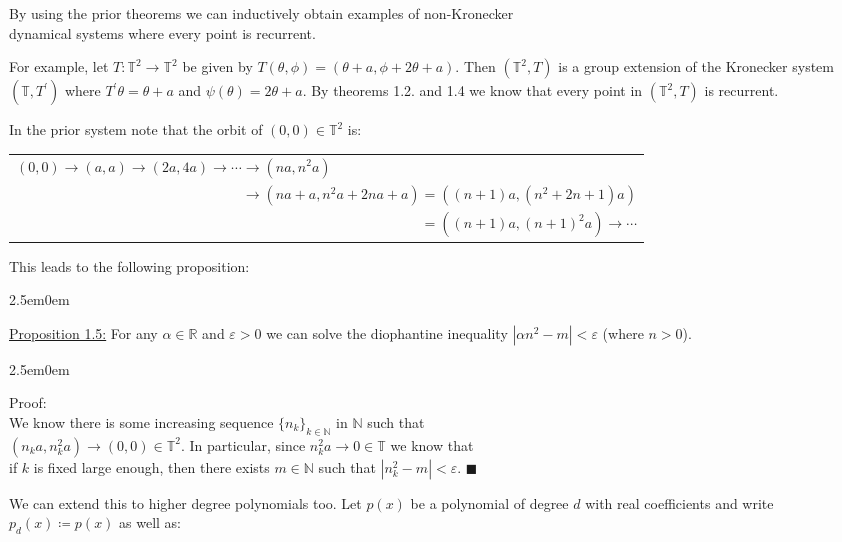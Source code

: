 \documentclass{book}
\newcommand{\hTwo}{%
\color{Black}%
   \fontsize{13}{15}\selectfont%
}
\newcommand{\exTwo}{%
   \color{Purple}%
   \fontsize{13}{15}\selectfont%
}
\newcommand{\exThreeP}{%
   \color{RedViolet}%
   \fontsize{12}{14}\selectfont%
}
\newenvironment{myIndent}{%
   \begin{adjustwidth}{2.5em}{0em}%
}{%
   \end{adjustwidth}%
}
\newcommand{\retTwo}{\hfill\bigbreak}
\begin{document}
\hTwo By using the prior theorems we can inductively obtain examples of non-Kronecker\\ dynamical systems where every point is recurrent.\retTwo

For example, let $T : \mathbb{T}^2 \to \mathbb{T}^2$ be given by $T(\theta, \phi) = (\theta + a, \phi + 2\theta + a)$. Then $(\mathbb{T}^2, T)$ is a group extension of the Kronecker system $(\mathbb{T}, T^\prime)$ where $T^\prime \theta = \theta + a$ and $\psi(\theta) = 2\theta + a$. By theorems 1.2. and 1.4 we know that every point in $(\mathbb{T}^2, T)$ is recurrent.

In the prior system note that the orbit of $(0, 0) \in \mathbb{T}^2$ is:

{\centering\begin{tabular}{l}
	$(0, 0) \to (a, a) \to (2a, 4a) \to \cdots \to (na, n^2 a)$\\ [4pt]
	$\phantom{(0, 0) \to (a, a) \to (2a, 4a) \to \cdots} \to (na + a, n^2a + 2na + a) = ((n+1)a, (n^2 +2n + 1)a)$\\ [4pt]
	$\phantom{(0, 0) \to (a, a) \to (2a, 4a) \to \cdots \to (na + a, n^2a + 2na + a)} = ((n+1)a, (n+1)^2a) \to \cdots$ 
\end{tabular}\retTwo\par}

This leads to the following proposition:

\begin{myIndent}\exTwo
	\ul{Proposition 1.5:} For any $\alpha \in \mathbb{R}$ and $\varepsilon > 0$ we can solve the diophantine inequality $|\alpha n^2 - m| < \varepsilon$ (where $n > 0$).

	\begin{myIndent}\exThreeP
		Proof:\\
		We know there is some increasing sequence $\{n_k\}_{k \in \mathbb{N}}$ in $\mathbb{N}$ such that\\ $(n_k a, n_k^2 a) \to (0, 0) \in \mathbb{T}^2$. In particular, since $n_k^2 a \to 0 \in \mathbb{T}$ we know that\\ if $k$ is fixed large enough, then there exists $m \in \mathbb{N}$ such that $|n_k^2 - m| < \varepsilon$. $\blacksquare$\retTwo
	\end{myIndent}
\end{myIndent}

We can extend this to higher degree polynomials too. Let $p(x)$ be a polynomial of degree $d$ with real coefficients and write $p_d(x) \coloneqq p(x)$ as well as:
\end{document}
